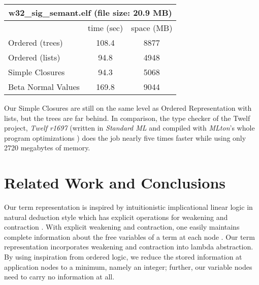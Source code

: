 \documentclass[submission,copyright,creativecommons]{eptcs}
\begin{document}
\begin{center}
 \begin{tabular}{| l || c | c |}
\multicolumn{3}{c}{\textsf{w32\_sig\_semant.elf} (file size: 20.9 MB)}\\
\hline
& time (sec) & space (MB) \\
\hline
\hline
Ordered (trees) & 108.4 & 8877\\
\hline
Ordered (lists) & 94.8 & 4948\\ %
\hline
Simple Closures & 94.3 & 5068 \\ %
\hline
Beta Normal Values & 169.8 & 9044  \\
\hline
\end{tabular}
\end{center}
Our Simple Closures are still on the same level as Ordered Representation with lists, but the trees are far behind. 
In comparison, the type checker of the Twelf project, \emph{Twelf
  r1697} (written in \emph{Standard ML} and compiled with
\emph{MLton}'s whole program optimizations \cite{fluetWeeks:icfp01}) 
does the job nearly five
times faster while using only 2720 megabytes of
memory. %





\section{Related Work and Conclusions}
\label{sec:concl}

Our term representation is inspired by intuitionistic implicational
linear logic in natural deduction style which has explicit operations
for weakening and contraction
\cite{bentonBiermanDePaivaHyland:tlca93}.  With explicit weakening and
contraction, one easily maintains complete information about the free
variables of a term at each node \cite{kesnerLengrand:infcomp07}.  Our
term representation incorporates weakening and contraction into lambda
abstraction.  By using inspiration from ordered logic, we reduce the
stored information at application nodes to a minimum, namely an
integer; further, our variable nodes need to carry no information at all.
\end{document}
